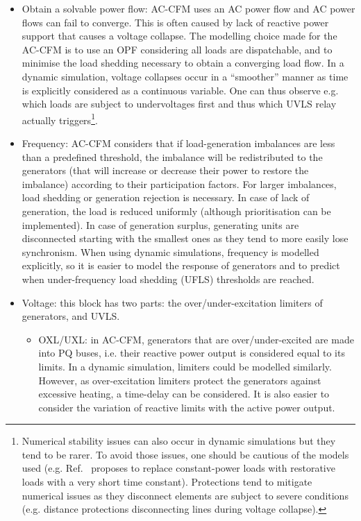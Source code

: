\begin{itemize}
    \item Obtain a solvable power flow: AC-CFM uses an AC power flow and AC power flows can fail to converge. This is often caused by lack of reactive power support that causes a voltage collapse. The modelling choice made for the AC-CFM is to use an OPF considering all loads are dispatchable, and to minimise the load shedding necessary to obtain a converging load flow. In a dynamic simulation, voltage collapses occur in a ``smoother'' manner as time is explicitly considered as a continuous variable. One can thus observe e.g. which loads are subject to undervoltages first and thus which UVLS relay actually triggers\footnote{Numerical stability issues can also occur in dynamic simulations but they tend to be rarer. To avoid those issues, one should be cautious of the models used (e.g. Ref.~\cite[p93-98]{SongThesis} proposes to replace constant-power loads with restorative loads with a very short time constant). Protections tend to mitigate numerical issues as they disconnect elements are subject to severe conditions (e.g. distance protections disconnecting lines during voltage collapse).}.
    \item Frequency: AC-CFM considers that if load-generation imbalances are less than a predefined threshold, the imbalance will be redistributed to the generators (that will increase or decrease their power to restore the imbalance) according to their participation factors. For larger imbalances, load shedding or generation rejection is necessary. In case of lack of generation, the load is reduced uniformly (although prioritisation can be implemented). In case of generation surplus, generating units are disconnected starting with the smallest ones as they tend to more easily lose synchronism. When using dynamic simulations, frequency is modelled explicitly, so it is easier to model the response of generators and to predict when under-frequency load shedding (UFLS) thresholds are reached.
    \item Voltage: this block has two parts: the over/under-excitation limiters of generators, and UVLS.
    \begin{itemize}
        \item OXL/UXL: in AC-CFM, generators that are over/under-excited are made into PQ buses, i.e. their reactive power output is considered equal to its limits. In a dynamic simulation, limiters could be modelled similarly. However, as over-excitation limiters protect the generators against excessive heating, a time-delay can be considered. It is also easier to consider the variation of reactive limits with the active power output.

\end{itemize}
\end{itemize}
